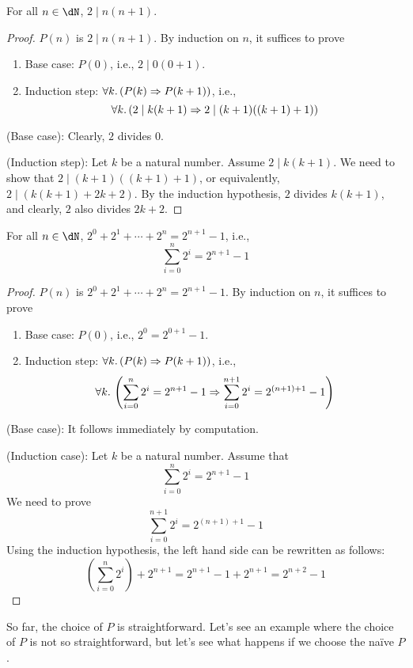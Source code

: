 \documentclass{amsart}
\begin{document}
\begin{prop}
  For all $n \in \dN$, $2 \mid n(n + 1)$.
\end{prop}
\begin{proof}
  $P(n)$ is $2 \mid n(n + 1)$.
  By induction on $n$, it suffices to prove
  \begin{enumerate}
  \item Base case: $P(0)$, i.e., $2 \mid 0(0 + 1)$.
  \item Induction step: $\forall k.\,(P(k) \Rightarrow P(k + 1))$, i.e.,
    \[ \forall k.\,(2 \mid k(k + 1) \Rightarrow 2 \mid (k + 1)((k + 1) + 1)) \]
  \end{enumerate}

  (Base case): Clearly, $2$ divides $0$.

  (Induction step): Let $k$ be a natural number.
  Assume $2 \mid k(k + 1)$.
  We need to show that $2 \mid (k + 1)((k + 1) + 1)$, or equivalently, $2 \mid (k(k+1) + 2k + 2)$.
  By the induction hypothesis, $2$ divides $k(k + 1)$, and clearly, $2$ also divides $2k + 2$.
\end{proof}

\begin{prop}
  For all $n \in \dN$, $2^{0} + 2^{1} + \cdots + 2^{n} = 2^{n + 1} - 1$, i.e.,
  \[
    \sum_{i=0}^{n}2^{i} = 2^{n + 1} - 1
  \]
\end{prop}
\begin{proof}
  $P(n)$ is $2^{0} + 2^{1} + \cdots + 2^{n} = 2^{n + 1} - 1$.
  By induction on $n$, it suffices to prove
  \begin{enumerate}
  \item Base case: $P(0)$, i.e., $2^{0} = 2^{0 + 1} - 1$.
  \item Induction step: $\forall k.\,(P(k) \Rightarrow P(k + 1))$, i.e.,
    \[ \forall k.\,\left(\sum_{i=0}^{n}2^{i} = 2^{n + 1} - 1 \Rightarrow \sum_{i=0}^{n+1}2^{i} = 2^{(n+1) + 1} - 1\right) \]
  \end{enumerate}
  
  (Base case): It follows immediately by computation.
  
  (Induction case): Let $k$ be a natural number.
  Assume that
  \[
    \sum_{i=0}^{n}2^{i} = 2^{n + 1} -1
  \]
  We need to prove
  \[
    \sum_{i=0}^{n+1}2^{i} = 2^{(n+1) + 1} - 1
  \]
  Using the induction hypothesis, the left hand side can be rewritten as follows:
  \[
    \left(\sum_{i=0}^{n}2^{i}\right) + 2^{n+1} = 2^{n + 1} - 1 + 2^{n + 1} = 2^{n + 2} - 1
  \]
\end{proof}

So far, the choice of $P$ is straightforward.
Let's see an example where the choice of $P$ is not so straightforward, but let's see what happens if we choose the na\"ive $P$.
\end{document}
